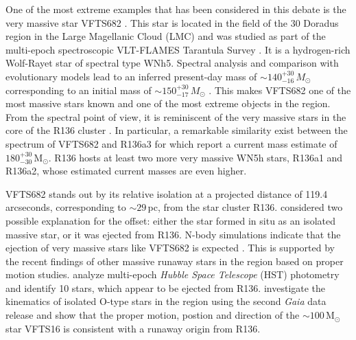 \documentclass[apjl,twocolumn]{emulateapj}
\newcommand{\Msun}{{\,\mathrm{M}_\odot}}
\begin{document}
One of the most extreme examples that has been considered in this debate is the very massive star VFTS682  \citep[][]{bestenlehner:11, bressert:12}. This star is located in the field of the 30 Doradus region in the Large Magellanic Cloud (LMC) and was studied as part of the multi-epoch spectroscopic VLT-FLAMES Tarantula Survey \citep[VFTS,][]{evans:11}. It is a hydrogen-rich Wolf-Rayet star of spectral type WNh5. Spectral analysis and comparison with evolutionary models lead to an inferred present-day mass of $\sim$$140^{+30}_{-16}\,M_\odot$ corresponding to an initial mass of $\sim$$150^{+30}_{-17}\,M_\odot$
\citep{schneider:18}. 
%
%
This makes VFTS682 one of the most massive stars known and one of the most extreme objects in the region.
%
From the spectral point of view, it is reminiscent of the very
massive stars %
 in the core of the R136 cluster \citep{dekoter:97,crowther:10, crowther:16}. 
 In particular, a remarkable similarity exist between the
spectrum of VFTS682 and R136a3 for which \citet{crowther:16} report a
current mass estimate of $180^{+30}_{-30}\Msun$. R136 hosts
at least two more very massive WN5h stars, R136a1 and R136a2, whose
estimated current masses are even higher. 


VFTS682 stands out by its relative isolation at a projected distance of 119.4 arcseconds, corresponding to 
$\sim$$29$\,pc, from  the star cluster R136. \citet{bestenlehner:11}
considered two possible explanation for the offset: either
the star formed in situ as an isolated massive star, %
or it was ejected from  R136. N-body simulations %
indicate that the ejection of very massive stars like VFTS682 is expected \citep[e.g.][]{fujii:11, banerjee:12}.  This is supported by the recent findings of other massive runaway stars in the region based on proper motion studies.   \citet{platais:15,platais:18} analyze multi-epoch \emph{Hubble Space Telescope} (HST) photometry and identify 10 stars, which appear to be ejected from R136.   \citet{lennon:18} investigate the kinematics of  isolated O-type stars in the region using the second \emph{Gaia} data release \cite[DR2,][]{gaia:16,brown:18} and show that the proper motion, postion and direction of the $\sim100\Msun$ star VFTS16 is consistent with a runaway origin from R136. 
\end{document}
